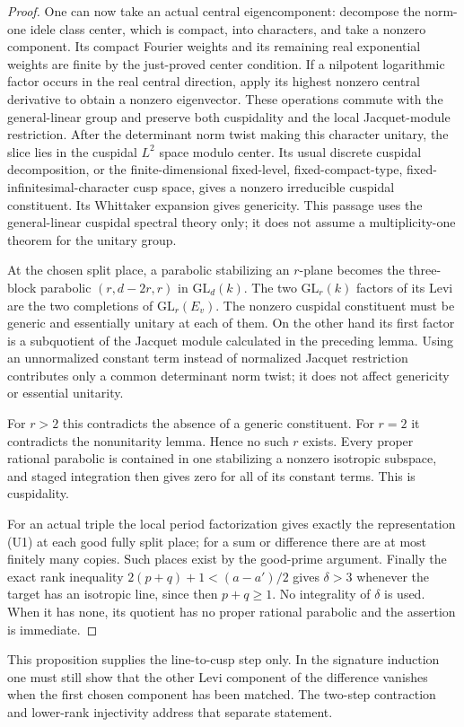 \begin{proof}
One can now take an actual central eigencomponent:
decompose the norm-one idele class center, which is compact,
into characters, and take a nonzero component. Its compact
Fourier weights and its remaining real exponential weights
are finite by the just-proved center condition. If a
nilpotent logarithmic factor occurs in the real central
direction, apply its highest nonzero central derivative
to obtain a nonzero eigenvector. These operations commute
with the general-linear group and preserve both cuspidality
and the local Jacquet-module restriction.
After the determinant norm twist making this character
unitary, the slice lies in the cuspidal \(L^2\) space modulo
center. Its usual discrete cuspidal decomposition, or the
finite-dimensional fixed-level, fixed-compact-type,
fixed-infinitesimal-character cusp space, gives a nonzero
irreducible cuspidal constituent. Its Whittaker expansion
gives genericity. This passage uses the general-linear
cuspidal spectral theory only; it does not assume a
multiplicity-one theorem for the unitary group.

At the chosen split place, a parabolic stabilizing an
\(r\)-plane becomes the three-block parabolic
\((r,d-2r,r)\) in \(\mathrm{GL}_d(k)\).
The two \(\mathrm{GL}_r(k)\) factors of its Levi are the
two completions of \(\mathrm{GL}_r(E_v)\).
The nonzero cuspidal constituent must be generic and
essentially unitary at each of them.
On the other hand its first factor is a subquotient of
the Jacquet module calculated in the preceding lemma.
Using an unnormalized constant term instead of normalized
Jacquet restriction contributes only a common determinant
norm twist; it does not affect genericity or essential
unitarity.

For \(r>2\) this contradicts the absence of a generic
constituent. For \(r=2\) it contradicts the nonunitarity
lemma. Hence no such \(r\) exists.
Every proper rational parabolic is contained in one
stabilizing a nonzero isotropic subspace, and staged
integration then gives zero for all of its constant terms.
This is cuspidality.

For an actual triple the local period factorization gives
exactly the representation (U1) at each good fully split
place; for a sum or difference there are at most finitely
many copies. Such places exist by the good-prime argument.
Finally the exact rank inequality
\(2(p+q)+1<(a-a')/2\) gives \(\delta>3\)
whenever the target has an isotropic line, since then
\(p+q\ge1\). No integrality of \(\delta\) is used. When it has
none, its quotient has no proper rational parabolic and
the assertion is immediate.
\end{proof}

This proposition supplies the line-to-cusp step only. In the
signature induction one must still show that the other Levi
component of the difference vanishes when the first chosen
component has been matched. The two-step contraction and
lower-rank injectivity address that separate statement.
